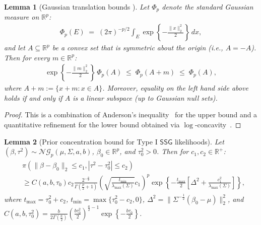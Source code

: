\documentclass[12pt]{article}
\newtheorem{lemma}{Lemma}[section]
\numberwithin{equation}{section}
\begin{document}
\begin{lemma}[Gaussian translation bounds \citep{anderson, Ball1993-vo}]
\label{lem:gaussian-translation}
Let $\Phi_p$ denote the standard Gaussian measure on $\mathbb{R}^p$:
\begin{align}
\Phi_p(E) \;=\; (2\pi)^{-p/2}\int_E \exp\left\{-\frac{\|x\|_2^2}{2}\right\}\,dx,
\end{align}
and let $A\subseteq\mathbb{R}^p$ be a convex set that is symmetric about the origin (i.e., $A=-A$).
Then for every $m\in\mathbb{R}^p$:
\begin{align}
\exp\left\{-\frac{\|m\|_2^2}{2}\right\}\,\Phi_p(A) \;\le\; \Phi_p(A+m)\;\le\; \Phi_p(A),
\end{align}
where $A+m:=\{x+m:x\in A\}$. 
Moreover, equality on the left hand side above holds if and only if $A$ is a linear subspace (up to Gaussian null sets).
\end{lemma}

\begin{proof}
This is a combination of Anderson’s inequality~\citep{anderson} for the upper bound and a quantitative refinement for the lower bound obtained via $\log$-concavity~\citep{Ball1993-vo}.
\end{proof}


\begin{lemma}[Prior concentration bound for Type I $\mathsf{SSG}$ likelihoods]\label{lemma:prior-inequality}
Let $(\beta, \tau^2) \sim \mathcal{NG}_p(\mu, \Sigma, a, b)$, $\beta_0 \in \mathbb{R}^p$, and $\tau_0^2 > 0$. Then for $c_1, c_2 \in \mathbb{R}^{+}$:
\begin{align}\label{eq:lemma-anderson-normal-gamma}
\begin{split}
&\pi(\lVert\beta - \beta_0\rVert_2 \leq c_1, |\tau^2 - \tau_0^2| \leq c_2)\\
&\geq C(a,b,\tau_0)c_2
\frac{2^{-\frac{p}{2}}}{\Gamma\left(\frac{p}{2}+1\right)}\left(\sqrt{\frac{t_{\min}}{\lambda_{\mathrm{max}}(\Sigma)}}c_1\right)^{p}
\exp\left\{-\frac{t_{\max}}{2}\left[\Delta^2 + \frac{c_1^2}{\lambda_{\mathrm{max}}(\Sigma)}\right]\right\},
\end{split}
\end{align}
where $t_{\max} = \tau_0^2 + c_2$, $t_{\min} = \max\{\tau_0^2 - c_2, 0\}$, $\Delta^{2} = \lVert \Sigma^{-\frac{1}{2}}(\beta_0-\mu)\rVert_{2}^{2}$, and $C(a,b,\tau^2_0) = \frac{b}{2\Gamma\left(\frac{a}{2}\right)}\left(\frac{b \tau_0^2}{2}\right)^{\frac{a}{2}-1}\exp\left\{-\frac{b\tau_0}{2}\right\}$.
\end{lemma}
\end{document}
